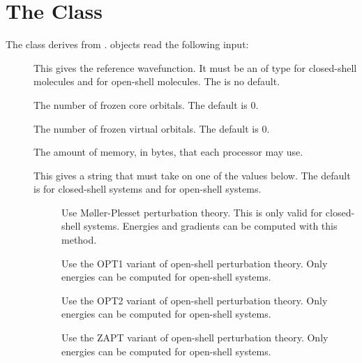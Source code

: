 

\section{The  Class}
\label{MBPT2}

The  class derives from .
 objects read the following input:

\begin{description}
  \item[] This gives the reference wavefunction.  It must
     be an  of type  for
     closed-shell molecules and  for open-shell
     molecules.  The is no default.

  \item[] The number of frozen core orbitals.  The default
     is 0.

  \item[] The number of frozen virtual orbitals.  The default
     is 0.

  \item[] The amount of memory, in bytes, that each processor
     may use.

  \item[] This gives a string that must take on one of the
     values below.  The default is  for closed-shell systems
     and  for open-shell systems.

      \begin{description}

        \item[] Use M\o{}ller-Plesset perturbation theory.  This
           is only valid for closed-shell systems.  Energies and
           gradients can be computed with this method.

        \item[] Use the OPT1 variant of open-shell perturbation
           theory.  Only energies can be computed for open-shell systems.

        \item[] Use the OPT2 variant of open-shell perturbation
           theory.  Only energies can be computed for open-shell systems.

        \item[] Use the ZAPT variant of open-shell perturbation
           theory.  Only energies can be computed for open-shell systems.


\end{description}
\end{description}
